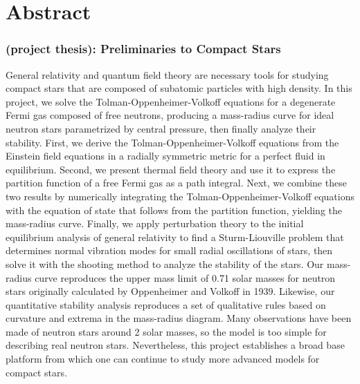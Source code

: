 \chapter{Abstract}

\subsection*{ (project thesis): Preliminaries to Compact Stars}

General relativity and quantum field theory are necessary tools for studying compact stars
that are composed of subatomic particles with high density.
In this project, we solve the Tolman-Oppenheimer-Volkoff equations for a degenerate Fermi gas composed of free neutrons,
producing a mass-radius curve for ideal neutron stars parametrized by central pressure, then finally analyze their stability.
First, we derive the Tolman-Oppenheimer-Volkoff equations from the Einstein field equations
in a radially symmetric metric for a perfect fluid in equilibrium.
Second, we present thermal field theory and use it
to express the partition function of a free Fermi gas as a path integral.
Next, we combine these two results by numerically integrating the Tolman-Oppenheimer-Volkoff equations
with the equation of state that follows from the partition function, yielding the mass-radius curve.
Finally, we apply perturbation theory to the initial equilibrium analysis of general relativity
to find a Sturm-Liouville problem that determines normal vibration modes for small radial oscillations of stars,
then solve it with the shooting method to analyze the stability of the stars.
Our mass-radius curve reproduces the upper mass limit of 0.71 solar masses
for neutron stars originally calculated by Oppenheimer and Volkoff in 1939.
Likewise, our quantitative stability analysis reproduces
a set of qualitative rules based on curvature and extrema in the mass-radius diagram.
Many observations have been made of neutron stars around 2 solar masses,
so the model is too simple for describing real neutron stars.
Nevertheless, this project establishes a broad base platform
from which one can continue to study more advanced models for compact stars.


